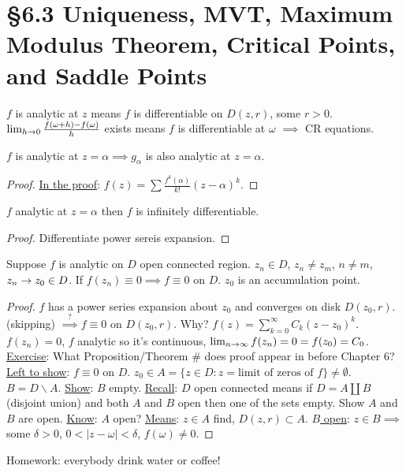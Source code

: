 \documentclass[]{article}
\begin{document}
\section{\S6.3 Uniqueness, MVT, Maximum Modulus Theorem, Critical Points, and Saddle Points}
\begin{definition}
	$f$ is analytic at $z$ means $f$ is differentiable on $D(z,r)$, some $r>0$. $\lim_{h\rightarrow 0} \frac{f(\omega+h)-f(\omega)}{h}$ exists means $f$ is differentiable at $\omega$ $\implies$ CR equations.
\end{definition}
\begin{proposition}
	$f$ is analytic at $z=\alpha \implies g_\alpha$ is also analytic at $z=\alpha$.
\end{proposition}
\begin{proof}
	\underline{In the proof}: $f(z) = \sum \frac{f^k(\alpha)}{k!} (z-\alpha)^k$.
\end{proof}
\begin{theorem}
	$f$ analytic at $z=\alpha$ then $f$ is infinitely differentiable.
\end{theorem}
\begin{proof}
	Differentiate power sereis expansion.
\end{proof}
\begin{theorem}
	 Suppose $f$ is analytic on $D$ open connected region. $z_n\in D$, $z_n\neq z_m$, $n\neq m$, $z_n\rightarrow z_0 \in D$. If $f(z_n)\equiv 0 \implies f\equiv 0$ on $D$. $z_0$ is an accumulation point.
	\label{thm6.9}
\end{theorem}
\begin{proof}
	$f$ has a power series expansion about $z_0$ and converges on disk $D(z_0,r)$.
	(skipping) $\overset{?}{\implies} f\equiv 0$ on $D(z_0,r)$.
	Why? $f(z) = \sum_{k=0}^\infty C_k(z-z_0)^k$. $f(z_n)=0$, $f$ analytic so it's continuous, $\lim_{n\rightarrow\infty}f(z_n) = 0 = f(z_0) = C_0$. \underline{Exercise}: What Proposition/Theorem \# does proof appear in before Chapter 6?
	\underline{Left to show}: $f\equiv 0$ on $D$. $z_0\in A = \{z\in D: z= \text{limit of zeros of $f$}\} \neq \emptyset$. $B = D\backslash A$. \underline{Show}: $B$ empty. \underline{Recall}: $D$ open connected means if $D=A\amalg B$ (disjoint union) and both $A$ and $B$ open then one of the sets empty. Show $A$ and $B$ are open. \underline{Know}: $A$ open? \underline{Means}: $z\in A$ find, $D(z,r)\subset A$. \underline{$B$ open}: $z\in B \implies$ some $\delta>0$, $0<|z-\omega|<\delta$, $f(\omega) \neq 0$.
\end{proof}
Homework: everybody drink water or coffee!
\end{document}
